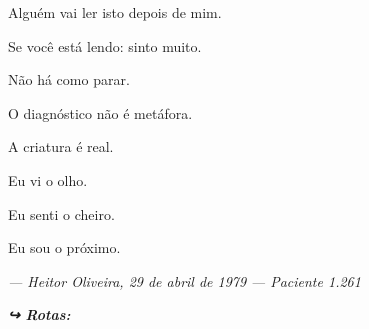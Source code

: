 \noindent Alguém vai ler isto depois de mim.

\noindent Se você está lendo: sinto muito.

\noindent Não há como parar.

\noindent O diagnóstico não é metáfora.

\noindent A criatura é real.

\noindent Eu vi o olho.

\noindent Eu senti o cheiro.

\noindent Eu sou o próximo.

\noindent \textit{--- Heitor Oliveira, 29 de abril de 1979}
\textit{--- Paciente 1.261}

\vspace{0.5em}
\noindent\textit{\textbf{↪ Rotas:}  \rotasep {}}